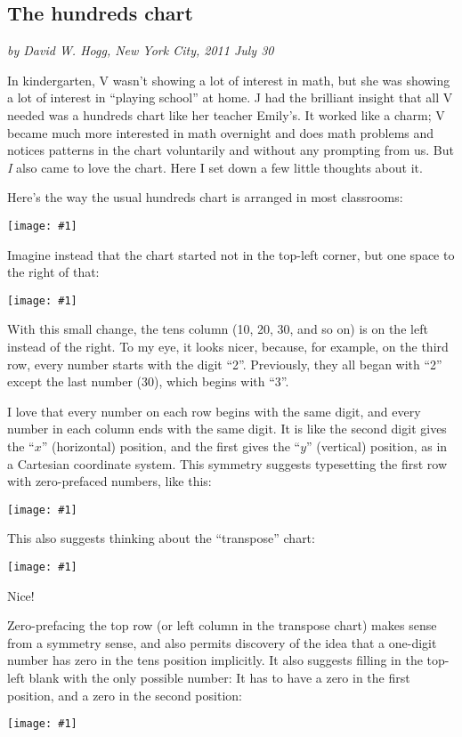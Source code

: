 \documentclass[12pt]{article}
\newcommand{\showchart}[1]{\texttt{[image: \#1]}}
\begin{document}
\subsection*{The hundreds chart}

\noindent
\textsl{by David W. Hogg, New York City, 2011 July 30}
\vspace{1ex}

In kindergarten, V wasn't showing a lot of interest in math, but she
was showing a lot of interest in ``playing school'' at home.  J had
the brilliant insight that all V needed was a hundreds chart like her
teacher Emily's.  It worked like a charm; V became much more
interested in math overnight and does math problems and notices
patterns in the chart voluntarily and without any prompting from us.
But \emph{I} also came to love the chart.  Here I set down a few
little thoughts about it.

Here's the way the usual hundreds chart is arranged in most
classrooms:
\begin{center}
\showchart{hundreds_chart_standard.pdf}
\end{center}

Imagine instead that the chart started not in the top-left corner,
but one space to the right of that:
\begin{center}
\showchart{hundreds_chart_skipzero_nzp.pdf}
\end{center}
With this small change, the tens column (10, 20, 30, and so on) is on
the left instead of the right.  To my eye, it looks nicer, because,
for example, on the third row, every number starts with the digit
``2''.  Previously, they all began with ``2'' except the last number
(30), which begins with ``3''.

I love that every number on each row begins with the same digit, and
every number in each column ends with the same digit.  It is like the
second digit gives the ``$x$'' (horizontal) position, and the first
gives the ``$y$'' (vertical) position, as in a Cartesian coordinate
system.  This symmetry suggests typesetting the first row with
zero-prefaced numbers, like this:
\begin{center}
\showchart{hundreds_chart_skipzero.pdf}
\end{center}
This also suggests thinking about the ``transpose'' chart:
\begin{center}
\showchart{hundreds_chart_transpose_skipzero.pdf}
\end{center}
Nice!

Zero-prefacing the top row (or left column in the transpose chart)
makes sense from a symmetry sense, and also permits discovery of the
idea that a one-digit number has zero in the tens position implicitly.
It also suggests filling in the top-left blank with the only possible
number: It has to have a zero in the first position, and a zero in the
second position:
\begin{center}
\showchart{hundreds_chart_default.pdf}
\end{center}
\end{document}
